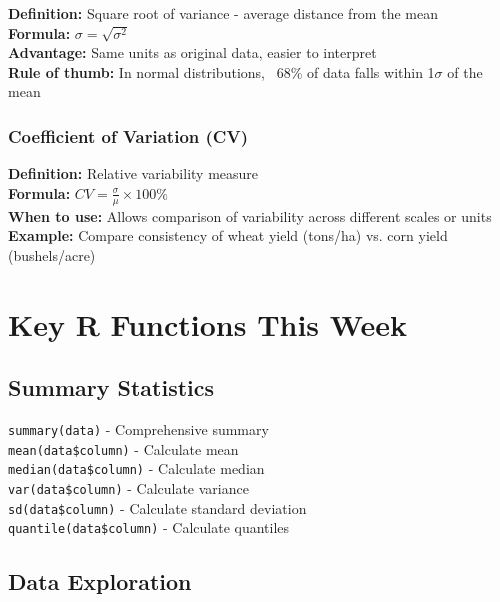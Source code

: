 \documentclass[11pt,a4paper]{article}
\begin{document}
\begin{formulabox}
\textbf{Definition:} Square root of variance - average distance from the mean\\[0.3cm]
\textbf{Formula:} $\sigma = \sqrt{\sigma^2}$\\[0.3cm]
\textbf{Advantage:} Same units as original data, easier to interpret\\
\textbf{Rule of thumb:} In normal distributions, ~68\% of data falls within 1$\sigma$ of the mean
\end{formulabox}

\subsubsection{Coefficient of Variation (CV)}

\begin{formulabox}
\textbf{Definition:} Relative variability measure\\[0.3cm]
\textbf{Formula:} $CV = \frac{\sigma}{\mu} \times 100\%$\\[0.3cm]
\textbf{When to use:} Allows comparison of variability across different scales or units\\
\textbf{Example:} Compare consistency of wheat yield (tons/ha) vs. corn yield (bushels/acre)
\end{formulabox}

\section{Key R Functions This Week}

\subsection{Summary Statistics}

\begin{infobox}
\texttt{summary(data)} - Comprehensive summary\\
\texttt{mean(data\$column)} - Calculate mean\\
\texttt{median(data\$column)} - Calculate median\\
\texttt{var(data\$column)} - Calculate variance\\
\texttt{sd(data\$column)} - Calculate standard deviation\\
\texttt{quantile(data\$column)} - Calculate quantiles
\end{infobox}

\subsection{Data Exploration}
\end{document}
